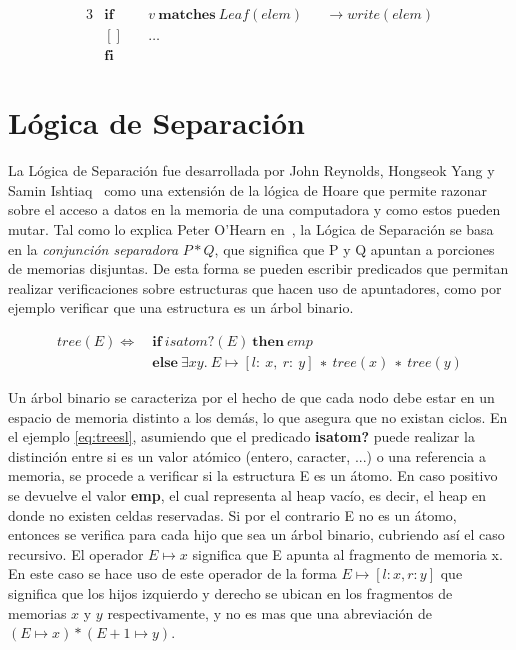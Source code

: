 \begin{alignat}{3}
&\boldsymbol{if}\ && v\ \boldsymbol{matches}\ Leaf(elem)         && \rightarrow write(elem) \nonumber \\
&\boldsymbol{[]}\ && \ldots                                                        \label{matches} \\
&\boldsymbol{fi} \nonumber
\end{alignat}


\section{Lógica de Separación}

La Lógica de Separación fue desarrollada por John Reynolds, Hongseok Yang y
Samin Ishtiaq~\cite{seplogpaper1,seplogpaper2,seplogpaper3} como una
extensión de la lógica de Hoare que permite razonar sobre el acceso a datos en
la memoria de una computadora y como estos pueden mutar. Tal como lo explica
Peter O'Hearn en~\cite{separation-logic}, la Lógica de Separación se basa en
la \textit{conjunción separadora} $P * Q$, que significa que P y Q apuntan a
porciones de memorias disjuntas. De esta forma se pueden escribir predicados
que permitan realizar verificaciones sobre estructuras que hacen uso de
apuntadores, como por ejemplo verificar que una estructura es un árbol
binario.

\begin{align}
  tree(E) \Longleftrightarrow\ &\boldsymbol{if}\ isatom?(E)\ \boldsymbol{then}\ emp \label{eq:treesl}\\
             &\boldsymbol{else}\ \exists xy.\ E\mapsto[l:\ x,\ r:\ y]\ ∗\ tree(x)\ ∗\ tree(y) \nonumber
\end{align}

Un árbol binario se caracteriza por el hecho de que cada nodo debe estar en un
espacio de memoria distinto a los demás, lo que asegura que no existan ciclos.
En el ejemplo \ref{eq:treesl}, asumiendo que el predicado \textbf{isatom?} puede realizar
la distinción entre si es un valor atómico (entero, caracter, ...) o una
referencia a memoria, se procede a verificar si la estructura E es un átomo.
En caso positivo se devuelve el valor \textbf{emp}, el cual representa al heap
vacío, es decir, el heap en donde no existen celdas reservadas. Si por el
contrario E no es un átomo, entonces se verifica para cada hijo que sea un
árbol binario, cubriendo así el caso recursivo. El operador 
$E\mapsto x$ significa que E apunta al fragmento de memoria x. En este caso se
hace uso de este operador de la forma $E\mapsto [l: x, r: y]$ que significa que
los hijos izquierdo y derecho se ubican en los fragmentos de memorias $x$ y $y$
respectivamente, y no es mas que una abreviación de $(E\mapsto x) * (E+1\mapsto y)$.

